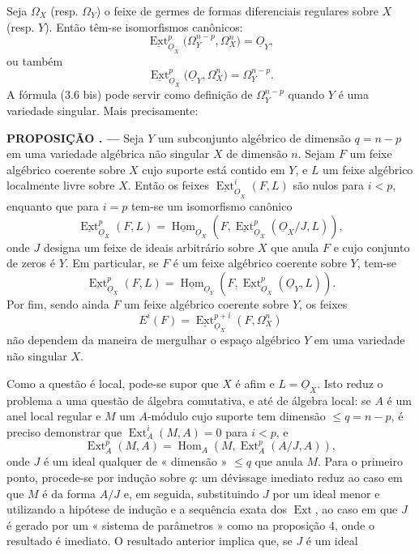 \documentclass[11pt,twoside,openany]{book}
\numberwithin{equation}{section}
\newcommand{\src}[1]{%
  \phantomsection\hypertarget{src:#1}{}%
  \marginpar{\raggedleft\footnotesize\sffamily #1}%
}
\newcommand{\Osh}{\underline{O}}
\newcommand{\Homsh}{\underline{\operatorname{Hom}}}
\newcommand{\Extsh}{\underline{\operatorname{Ext}}}
\theoremstyle{plain}
\theoremstyle{definition}
\theoremstyle{remark}
\newcommand{\result}[2]{%
  \par\medskip\noindent\textbf{#1%
  \if\relax\detokenize{#2}\relax\else\space#2\fi. ---}\enspace
}
\newcommand{\FgaUnitKey}{frontmatter}
\renewcommand{\src}[1]{%
  \phantomsection\hypertarget{src:\FgaUnitKey:#1}{}%
  \marginpar{\raggedleft\footnotesize\sffamily #1}%
}
\begin{document}
\src{176}
Seja $\Omega_X$ (resp. $\Omega_Y$) o feixe de germes de formas
diferenciais regulares sobre $X$ (resp. $Y$). Então têm-se isomorfismos
canônicos:
\begin{equation}\tag{3.6}
  \Extsh_{\Osh_X}^{p}\bigl(\Omega_Y^{n-p},\Omega_X^{n}\bigr)=\Osh_Y,
\end{equation}
ou também
\begin{equation}\tag{3.6 bis}
  \Extsh_{\Osh_X}^{p}\bigl(\Osh_Y,\Omega_X^{n}\bigr)=\Omega_Y^{n-p}.
\end{equation}
A fórmula (3.6 bis) pode servir como definição de $\Omega_Y^{n-p}$ quando $Y$
é uma variedade singular. Mais precisamente:

\result{PROPOSIÇÃO}{5} Seja $Y$ um subconjunto algébrico de dimensão
$q=n-p$ em uma variedade algébrica não singular $X$ de dimensão $n$. Sejam
$F$ um feixe algébrico coerente sobre $X$ cujo suporte está contido em $Y$, e $L$
um feixe algébrico localmente livre sobre $X$. Então os feixes
$\Extsh_{\Osh_X}^{i}(F,L)$ são nulos para $i<p$, enquanto que para $i=p$ tem-se um
isomorfismo canônico
\begin{equation}\tag{3.7}
  \Extsh_{\Osh_X}^{p}(F,L)
  =\Homsh_{\Osh_X}\!\left(F,
  \Extsh_{\Osh_X}^{p}(\Osh_X/J,L)\right),
\end{equation}
onde $J$ designa um feixe de ideais arbitrário sobre $X$ que anula $F$ e cujo
conjunto de zeros é $Y$. Em particular, se $F$ é um feixe algébrico
coerente sobre $Y$, tem-se
\begin{equation}\tag{3.7 bis}
  \Extsh_{\Osh_X}^{p}(F,L)
  =\Homsh_{\Osh_Y}\!\left(F,\Extsh_{\Osh_X}^{p}(\Osh_Y,L)\right).
\end{equation}
Por fim, sendo ainda $F$ um feixe algébrico coerente sobre $Y$, os feixes
\[
  E^{i}(F)=\Extsh_{\Osh_X}^{p+i}(F,\Omega_X^{n})
\]
não dependem da maneira de mergulhar o espaço algébrico $Y$ em uma variedade
não singular $X$.

Como a questão é local, pode-se supor que $X$ é afim e $L=\Osh_X$. Isto reduz
o problema a uma questão de álgebra comutativa, e até de álgebra local: se $A$ é um
anel local regular e $M$ um $A$-módulo cujo suporte tem dimensão
$\leq q=n-p$, é preciso demonstrar que $\operatorname{Ext}_{A}^{i}(M,A)=0$ para $i<p$, e
\[
  \operatorname{Ext}_{A}^{p}(M,A)
  =\operatorname{Hom}_{A}\!\left(M,\operatorname{Ext}_{A}^{p}(A/J,A)\right),
\]
onde $J$ é um ideal qualquer de « dimensão » $\leq q$ que anula $M$. Para o
primeiro ponto, procede-se por indução sobre $q$: um dévissage imediato reduz
ao caso em que $M$ é da forma $A/J$ e, em seguida, substituindo $J$ por um ideal menor
e utilizando a hipótese de indução e a sequência exata dos
$\operatorname{Ext}$, ao caso em que $J$ é gerado por um « sistema de parâmetros »
como na proposição 4, onde o resultado é imediato. O resultado
anterior implica que, se $J$ é um ideal
\end{document}
